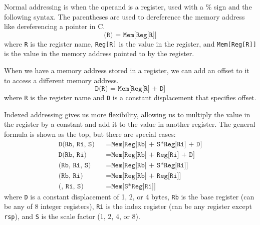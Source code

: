 \documentclass{article}
\begin{document}
    \begin{definition}
      Normal addressing is when the operand is a register, used with a \% sign and the following syntax. The parentheses are used to dereference the memory address like dereferencing a pointer in C. 
      \begin{equation}
        \texttt{(R) = Mem[Reg[R]]}
      \end{equation}
      where \texttt{R} is the register name, \texttt{Reg[R]} is the value in the register, and \texttt{Mem[Reg[R]]} is the value in the memory address pointed to by the register. 
    \end{definition}

    \begin{definition}
      When we have a memory address stored in a register, we can add an offset to it to access a different memory address. 
      \begin{equation}
        \texttt{D(R) = Mem[Reg[R] + D]}
      \end{equation}
      where \texttt{R} is the register name and \texttt{D} is a constant displacement that specifies offset. 
    \end{definition}

    \begin{definition}
      Indexed addressing gives us more flexibility, allowing us to multiply the value in the register by a constant and add it to the value in another register. The general formula is shown as the top, but there are special cases: 
      \begin{align*}
        \texttt{D(Rb, Ri, S)} && = \texttt{Mem[Reg[Rb] + S*Reg[Ri] + D]} \\ 
        \texttt{D(Rb, Ri)} && = \texttt{Mem[Reg[Rb] + Reg[Ri] + D]} \\
        \texttt{(Rb, Ri, S)} && = \texttt{Mem[Reg[Rb] + S*Reg[Ri]]} \\ 
        \texttt{(Rb, Ri)} && = \texttt{Mem[Reg[Rb] + Reg[Ri]]} \\
        \texttt{(, Ri, S)} && = \texttt{Mem[S*Reg[Ri]]} 
      \end{align*}
      where \texttt{D} is a constant displacement of 1, 2, or 4 bytes, \texttt{Rb} is the base register (can be any of 8 integer registers), \texttt{Ri} is the index register (can be any register except \texttt{rsp}), and \texttt{S} is the scale factor (1, 2, 4, or 8). 
    \end{definition}
\end{document}
